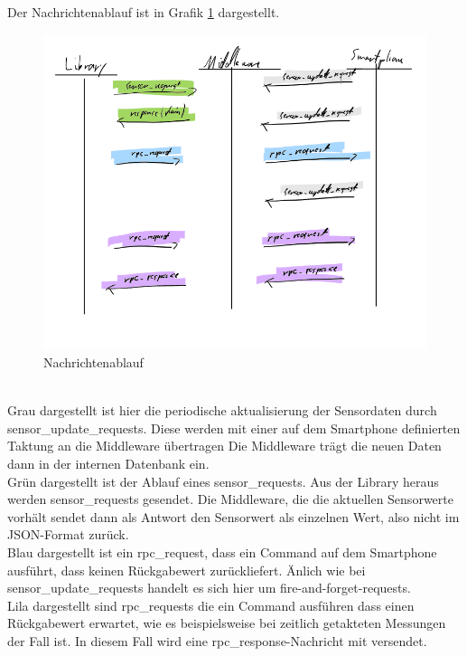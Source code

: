 \documentclass[11pt,a4paper]{report}
\begin{document}
Der Nachrichtenablauf ist in Grafik \ref*{fig:message flow} dargestellt.
\begin{figure}[htbp]
  \centering
  \includegraphics[width=.9\textwidth]{images/message_flow.png}
  \caption{Nachrichtenablauf}
  \label{fig:message flow}
\end{figure}
\\
Grau dargestellt ist hier die periodische aktualisierung der Sensordaten durch sensor\_update\_requests.
Diese werden mit einer auf dem Smartphone definierten Taktung an die Middleware übertragen
Die Middleware trägt die neuen Daten dann in der internen Datenbank ein.
\\
Grün dargestellt ist der Ablauf eines sensor\_requests.
Aus der Library heraus werden sensor\_requests gesendet.
Die Middleware, die die aktuellen Sensorwerte vorhält sendet dann als Antwort den Sensorwert als einzelnen Wert, also nicht im JSON-Format zurück.
\\
Blau dargestellt ist ein rpc\_request, dass ein Command auf dem Smartphone ausführt, dass keinen Rückgabewert zurückliefert. Änlich wie bei sensor\_update\_requests handelt es sich hier um fire-and-forget-requests.
\\
Lila dargestellt sind rpc\_requests die ein Command ausführen dass einen Rückgabewert erwartet, wie es beispielsweise bei zeitlich getakteten Messungen der Fall ist. 
In diesem Fall wird eine rpc\_response-Nachricht mit versendet.
\end{document}
